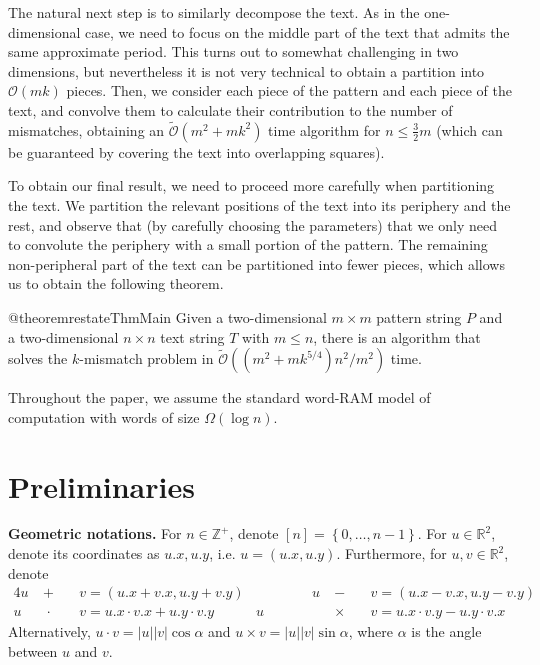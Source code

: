 \documentclass[twoside,leqno]{article}
\newcommand{\R}{\mathbb{R}}
\newcommand{\Z}{\mathbb{Z}}
\renewcommand{\O}{\mathcal{O}}
\newcommand{\tO}{\tilde{\mathcal{O}}}
\renewcommand{\phi}{\varphi}
\newcommand{\set}[1]{\left\lbrace #1 \right\rbrace}
\newcommand{\absolute}[1]{\left\lvert#1\right\rvert}
\begin{document}
The natural next step is to similarly decompose the text. As in the one-dimensional case, we
need to focus on the middle part of the text that admits the same approximate period. This turns out
to somewhat challenging in two dimensions, but nevertheless it is not very technical to obtain
a partition into $\O(mk)$ pieces. Then, we consider each piece of the pattern and each piece of the text,
and convolve them to calculate their contribution to the number of mismatches, obtaining an $\tO(m^{2}+mk^{2})$ time
algorithm for $n\leq \frac{3}{2}m$ (which can be guaranteed by covering the text into overlapping
squares).

To obtain our final result, we need to proceed more carefully when partitioning the text. We partition
the relevant positions of the text into its periphery and the rest, and observe that (by carefully choosing the parameters)
that we only need to convolute the periphery with a small portion of the pattern. The remaining non-peripheral
part of the text can be partitioned into fewer pieces, which allows us to obtain the following theorem.


\def\mainThmTitle{Informal version}
\def\mainThmContent{%
Given a two-dimensional $m \times m$ pattern string $P$ and a two-dimensional $n \times n$ text string $T$ with $m \le n$,
there is an algorithm that solves the $k$-mismatch problem in $\tO((m^2 + mk^{5/4})n^2 / m^2)$ time.%
}

\begin{restatable}[\mainThmTitle]{@theorem}{restateThmMain}\label{th:main}
\mainThmContent%
\end{restatable}

\noindent Throughout the paper, we assume the standard word-RAM model of computation with words of size $\Omega(\log n)$.

\section{Preliminaries}
\label{sec:preliminaries}
\newcommand{\x}[1]{#1.x}
\newcommand{\y}[1]{#1.y}
\newcommand{\h}[1]{\phi \times #1}
\newcommand{\s}[1]{\psi \times #1}

\textbf{Geometric notations.} For $n \in \Z^+$, denote $[n] = \set{0, \dots, n - 1}$. For $u \in \R^2$, denote its coordinates as $\x{u}, \y{u}$, i.e. $u = (\x{u}, \y{u})$. Furthermore, for $u, v \in \R^2$, denote 
\begin{alignat*}{4}
u &\ +\ &&      v = (\x{u}+\x{v}, \y{u} + \y{v}) & \qquad\qquad
u &\ -\ &&      v = (\x{u}-\x{v}, \y{u}-\y{v})\\
u &\ \;\cdot\ &&  v = \x{u} \cdot \x{v} + \y{u} \cdot \y{v} & 
u &\ \times\ && v = \x{u} \cdot \y{v} - \y{u} \cdot \x{v}
\end{alignat*}
Alternatively, $u \cdot v = \absolute{u}\absolute{v} \cos \alpha$ and $u \times v = \absolute{u}\absolute{v} \sin \alpha$, where $\alpha$ is the angle between $u$ and $v$.
\end{document}
